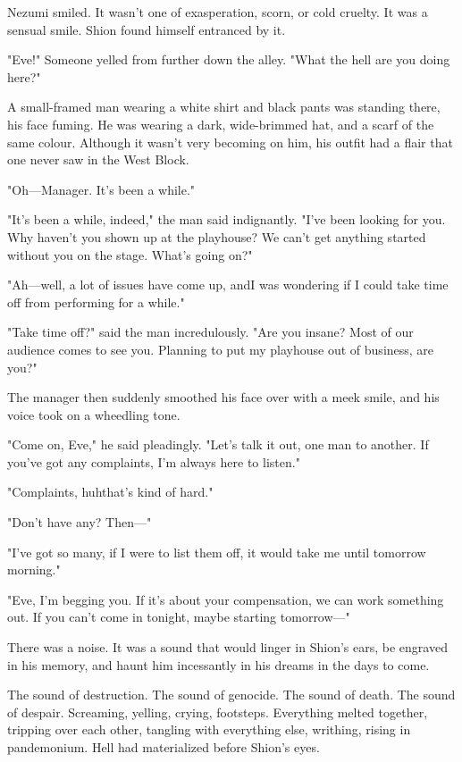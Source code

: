 Nezumi smiled. It wasn't one of exasperation, scorn, or cold cruelty. It
was a sensual smile. Shion found himself entranced by it.

"Eve!" Someone yelled from further down the alley. "What the hell are
you doing here?"

A small-framed man wearing a white shirt and black pants was standing
there, his face fuming. He was wearing a dark, wide-brimmed hat, and a
scarf of the same colour. Although it wasn't very becoming on him, his
outfit had a flair that one never saw in the West Block.

"Oh---Manager. It's been a while."

"It's been a while, indeed," the man said indignantly. "I've been
looking for you. Why haven't you shown up at the playhouse? We can't get
anything started without you on the stage. What's going on?"

"Ah---well, a lot of issues have come up, and\el I was wondering if I
could take time off from performing for a while."

"Take time off?" said the man incredulously. "Are you insane? Most of
our audience comes to see you. Planning to put my playhouse out of
business, are you?"

The manager then suddenly smoothed his face over with a meek smile, and
his voice took on a wheedling tone.

"Come on, Eve," he said pleadingly. "Let's talk it out, one man to
another. If you've got any complaints, I'm always here to listen."

"Complaints, huh\el that's kind of hard."

"Don't have any? Then---"

"I've got so many, if I were to list them off, it would take me until
tomorrow morning."

"Eve, I'm begging you. If it's about your compensation, we can work
something out. If you can't come in tonight, maybe starting tomorrow---"

There was a noise. It was a sound that would linger in Shion's ears, be
engraved in his memory, and haunt him incessantly in his dreams in the
days to come.

The sound of destruction. The sound of genocide. The sound of death. The
sound of despair. Screaming, yelling, crying, footsteps. Everything
melted together, tripping over each other, tangling with everything
else, writhing, rising in pandemonium. Hell had materialized before
Shion's eyes.

